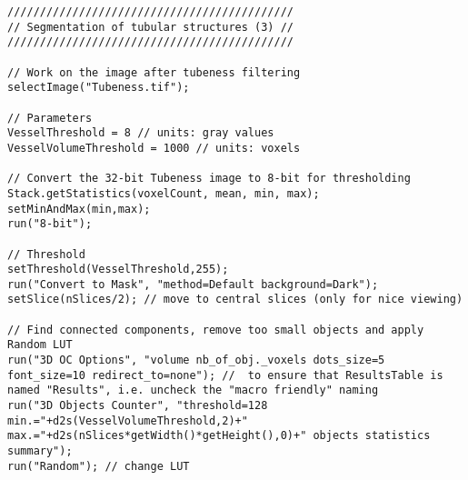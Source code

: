 \begin{lstlisting}
////////////////////////////////////////////
// Segmentation of tubular structures (3) //
////////////////////////////////////////////

// Work on the image after tubeness filtering
selectImage("Tubeness.tif");

// Parameters
VesselThreshold = 8 // units: gray values
VesselVolumeThreshold = 1000 // units: voxels

// Convert the 32-bit Tubeness image to 8-bit for thresholding
Stack.getStatistics(voxelCount, mean, min, max);
setMinAndMax(min,max);
run("8-bit");

// Threshold
setThreshold(VesselThreshold,255);
run("Convert to Mask", "method=Default background=Dark"); 
setSlice(nSlices/2); // move to central slices (only for nice viewing)

// Find connected components, remove too small objects and apply Random LUT
run("3D OC Options", "volume nb_of_obj._voxels dots_size=5 font_size=10 redirect_to=none"); //  to ensure that ResultsTable is named "Results", i.e. uncheck the "macro friendly" naming
run("3D Objects Counter", "threshold=128 min.="+d2s(VesselVolumeThreshold,2)+" max.="+d2s(nSlices*getWidth()*getHeight(),0)+" objects statistics summary");
run("Random"); // change LUT

\end{lstlisting}